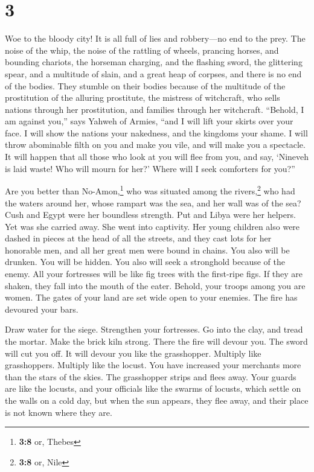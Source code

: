 \hypertarget{section-2}{%
\section{3}\label{section-2}}

 Woe to the bloody city! It is all full of lies and
robbery---no end to the prey.  The noise of the whip, the
noise of the rattling of wheels, prancing horses, and bounding chariots,
 the horseman charging, and the flashing sword, the
glittering spear, and a multitude of slain, and a great heap of corpses,
and there is no end of the bodies. They stumble on their bodies
 because of the multitude of the prostitution of the
alluring prostitute, the mistress of witchcraft, who sells nations
through her prostitution, and families through her witchcraft.
 ``Behold, I am against you,'' says Yahweh of Armies,
``and I will lift your skirts over your face. I will show the nations
your nakedness, and the kingdoms your shame.  I will throw
abominable filth on you and make you vile, and will make you a
spectacle.  It will happen that all those who look at you
will flee from you, and say, `Nineveh is laid waste! Who will mourn for
her?' Where will I seek comforters for you?''

 Are you better than No-Amon,\footnote{\textbf{3:8} or,
  Thebes} who was situated among the rivers,\footnote{\textbf{3:8} or,
  Nile} who had the waters around her, whose rampart was the sea, and
her wall was of the sea?  Cush and Egypt were her
boundless strength. Put and Libya were her helpers.  Yet
was she carried away. She went into captivity. Her young children also
were dashed in pieces at the head of all the streets, and they cast lots
for her honorable men, and all her great men were bound in chains.
 You also will be drunken. You will be hidden. You also
will seek a stronghold because of the enemy.  All your
fortresses will be like fig trees with the first-ripe figs. If they are
shaken, they fall into the mouth of the eater.  Behold,
your troops among you are women. The gates of your land are set wide
open to your enemies. The fire has devoured your bars.

 Draw water for the siege. Strengthen your fortresses. Go
into the clay, and tread the mortar. Make the brick kiln strong.
 There the fire will devour you. The sword will cut you
off. It will devour you like the grasshopper. Multiply like
grasshoppers. Multiply like the locust.  You have
increased your merchants more than the stars of the skies. The
grasshopper strips and flees away.  Your guards are like
the locusts, and your officials like the swarms of locusts, which settle
on the walls on a cold day, but when the sun appears, they flee away,
and their place is not known where they are.

